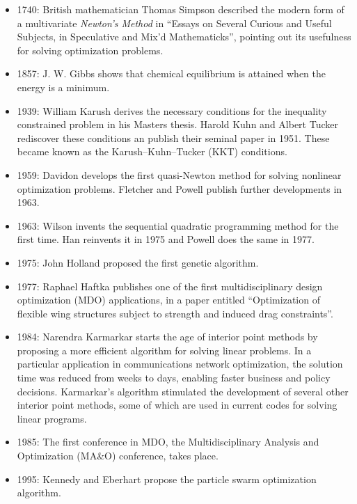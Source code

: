 \documentclass[conf]{new-aiaa}
\begin{document}
    \begin{itemize}[itemsep=1.2em, label={}, itemindent=-2.9em]
        \item 1740: British mathematician Thomas Simpson described the modern form of a multivariate \textit{Newton's Method} in ``Essays on Several Curious and Useful Subjects, in Speculative and Mix'd Mathematicks'', pointing out its usefulness for solving optimization problems. 
        \item 1857: J. W. Gibbs shows that chemical equilibrium is attained when the energy is a minimum.
        \item 1939: William Karush derives the necessary conditions for the inequality constrained problem in his Masters thesis. Harold Kuhn and Albert Tucker rediscover these conditions an publish their seminal  
            paper in 1951. These became known as the Karush–Kuhn–Tucker (KKT) conditions.
        \item 1959: Davidon develops the first quasi-Newton method for solving nonlinear optimization problems. Fletcher and Powell publish further developments in 1963.
        \item 1963: Wilson invents the sequential quadratic programming method for the first time. Han reinvents it in 1975 and Powell does the same in 1977.
        \item 1975: John Holland proposed the first genetic algorithm.
        \item 1977: Raphael Haftka publishes one of the first multidisciplinary design optimization (MDO) applications, 
                in a paper entitled “Optimization of flexible wing structures subject to strength and induced drag constraints”.
        \item 1984: Narendra Karmarkar starts the age of interior point methods by proposing a more efficient algorithm for solving linear problems. In a particular application in communications network optimization, the solution time was reduced from weeks to days, enabling faster business and policy decisions. Karmarkar’s algorithm stimulated the development of several other interior point methods, some of which are used in current codes for solving linear programs.
        \item 1985: The first conference in MDO, the Multidisciplinary Analysis and Optimization (MA\&O) conference, takes place.
        \item 1995: Kennedy and Eberhart propose the particle swarm optimization algorithm.
    \end{itemize}
\end{document}
